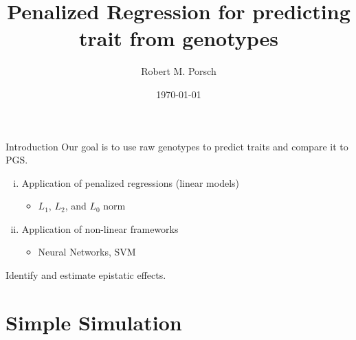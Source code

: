 \documentclass{beamer}
\title{Penalized Regression for predicting trait from genotypes}
\date{\today}
\author{Robert M. Porsch}
\institute{Center of Genomic Science}
\begin{document}
\maketitle

\begin{frame}[t]{Introduction}
  Our goal is to use raw genotypes to predict traits and compare it to PGS\@.
  \begin{enumerate}[(i)]
    \item Application of penalized regressions (linear models)
      \begin{itemize}
        \item $L_1$, $L_2$, and $L_0$ norm
      \end{itemize}
    \item Application of non-linear frameworks
      \begin{itemize}
        \item Neural Networks, SVM
      \end{itemize}
  \end{enumerate}
  Identify and estimate epistatic effects.
\end{frame}

\section{Simple Simulation}
\label{sec:simulation}
\end{document}

